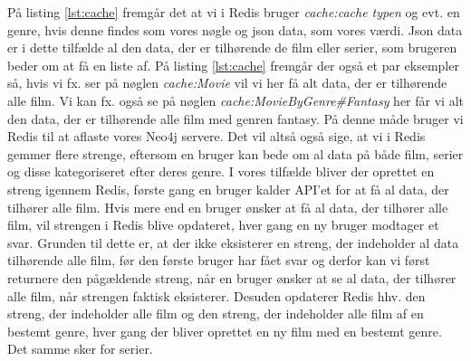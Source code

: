 På listing \ref{lst:cache} fremgår det at vi i Redis bruger \textit{cache:cache typen} og evt. en genre, hvis denne findes som vores nøgle og json data, som vores værdi. Json data er i dette tilfælde al den data, der er tilhørende de film eller serier, som brugeren beder om at få en liste af. På listing \ref{lst:cache} fremgår der også et par eksempler så, hvis vi fx. ser på nøglen \textit{cache:Movie} vil vi her få alt data, der er tilhørende alle film. Vi kan fx. også se på nøglen \textit{cache:MovieByGenre\#Fantasy} her får vi alt den data, der er tilhørende alle film med genren fantasy. På denne måde bruger vi Redis til at aflaste vores Neo4j servere. Det vil altså også sige, at vi i Redis gemmer flere strenge, eftersom en bruger kan bede om al data på både film, serier og disse kategoriseret efter deres genre. I vores tilfælde bliver der oprettet en streng igennem Redis, første gang en bruger kalder API’et for at få al data, der tilhører alle film. Hvis mere end en bruger ønsker at få al data, der tilhører alle film, vil strengen i Redis blive opdateret, hver gang en ny bruger modtager et svar. Grunden til dette er, at der ikke eksisterer en streng, der indeholder al data tilhørende alle film, før den første bruger har fået svar og derfor kan vi først returnere den pågældende streng, når en bruger ønsker at se al data, der tilhører alle film, når strengen faktisk eksisterer. Desuden opdaterer Redis hhv. den streng, der indeholder alle film og den streng, der indeholder alle film af en bestemt genre, hver gang der bliver oprettet en ny film med en bestemt genre. Det samme sker for serier.